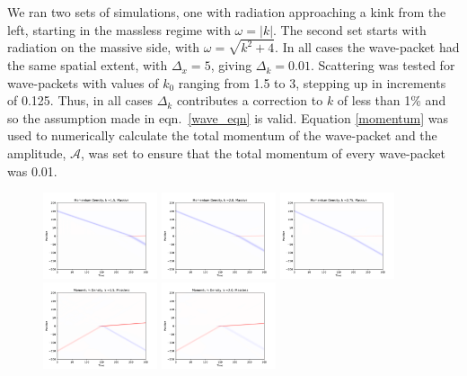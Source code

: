 \documentclass[11pt, oneside,titlepage]{article}  	%
\numberwithin{equation}{section}
\begin{document}
We ran two sets of simulations, one with radiation approaching a kink from the left, starting in the massless regime with $\omega = |k|$. The second set starts with radiation on the massive side, with $\omega = \sqrt{k^2 + 4}$. In all cases the wave-packet had the same spatial extent, with $\Delta_x = 5$, giving $\Delta_k = 0.01$. Scattering was tested for wave-packets with values of $k_0$ ranging from 1.5 to 3, stepping up in increments of 0.125. Thus, in all cases $\Delta_k$ contributes a correction to $k$ of less than 1\% and so the assumption made in eqn.~\ref{wave_eqn} is valid. Equation \ref{momentum} was used to numerically calculate the total momentum of the wave-packet and the amplitude, $\mathcal{A}$, was set to ensure that the total momentum of every wave-packet was 0.01.\par
\begin{figure}
\centering
\includegraphics[width=0.3\textwidth]{MomentumDensityk15Massive.pdf}
\includegraphics[width=0.3\textwidth]{MomentumDensityk20Massive.pdf}
\includegraphics[width=0.3\textwidth]{MomentumDensityk275Massive.pdf}
\includegraphics[width=0.3\textwidth]{MomentumDensityk15Massless.pdf}
\includegraphics[width=0.3\textwidth]{MomentumDensityk20Massless.pdf}

\end{figure}
\end{document}
